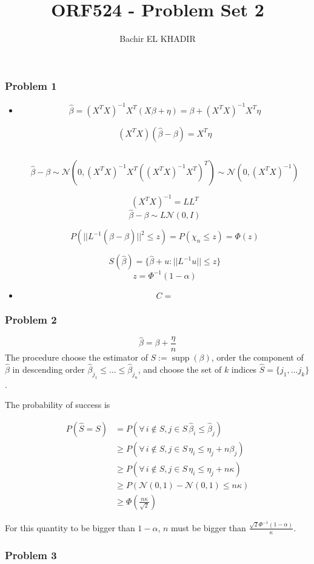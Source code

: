 \documentclass[12pt]{article}
\title{ORF524 - Problem Set 2}
\author{Bachir EL KHADIR }
\newcommand{\Q}[1]{\subsubsection*{Problem #1}}
\begin{document}
\maketitle

\Q{1}
\begin{itemize}
\item 
$$\hat \beta = (X^TX)^{-1}X^T(X\beta + \eta) = \beta + (X^TX)^{-1}X^T\eta$$

$$ (X^TX)(\hat \beta - \beta) = X^T \eta$$

$$ $$


$$\hat \beta - \beta \sim \mathcal N(0, (X^TX)^{-1}X^T ((X^TX)^{-1}X^T)^T) \sim \mathcal N(0, (X^TX)^{-1})$$


$$(X^TX)^{-1} = LL^T$$
$$\hat \beta - \beta \sim L \mathcal  N(0, I)$$

$$P(||L^{-1}(\hat \beta - \beta)||^2 \leq z ) = P(\chi_n \leq z ) = \Phi(z)$$ 

$$S(\hat \beta) = \{ \hat \beta + u : ||L^{-1}u|| \leq z \}$$
$$ z = \Phi^{-1}(1 - \alpha)$$
\item $$C  = $$
\end{itemize}

\Q{2}
$$\hat \beta = \beta + \frac{\eta}n$$
The procedure choose the estimator of $S := \operatorname{supp}(\beta)$, order the component of $\hat \beta$ in descending order $\hat \beta_{j_1} \le ... \le \hat \beta_{j_n}$, and choose the set of $k$ indices $\hat S = \{j_1, ... j_k\}$.

The probability of success is

\begin{align*}
P(\hat S = S) &= P(\forall \, i \not \in S, j \in S \, \hat \beta_i \le \hat \beta_j) 
\\&\ge P(\forall \, i \not \in S, j \in S \, \eta_i \le \eta_j + n \beta_j)
\\&\ge P(\forall \, i \not \in S, j \in S \, \eta_i \le \eta_j + n \kappa)
\\&\ge P(\mathcal N(0, 1) - \mathcal N(0, 1) \leq n \kappa)
\\&\ge \Phi(\frac{n \kappa}{\sqrt 2})
\end{align*}

For this quantity to be bigger than $1 - \alpha$, $n$ must be bigger than $\frac{\sqrt 2 \Phi^{-1}(1 - \alpha)}{\kappa}$.

\Q{3}
\end{document}
